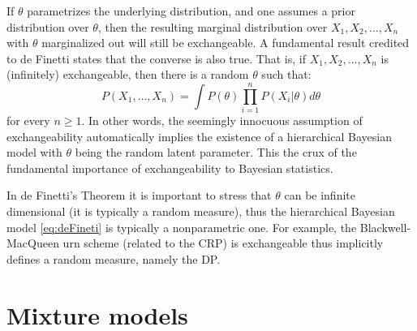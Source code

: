 If $\theta$ parametrizes the underlying distribution, and one assumes a prior distribution over $\theta$, then the resulting marginal distribution over $X_1,X_2,\dots,X_n$ with $\theta$ marginalized out will still be exchangeable. A fundamental result credited to de Finetti \cite{finetti31} states that the converse is also true. That is, if $X_1,X_2,\dots,X_n$ is (infinitely) exchangeable, then there is a random $\theta$ such that:
\begin{equation} \label{eq:deFineti}
P(X_1,\dots,X_n) = \int{P(\theta)\prod_{i=1}^n{P(X_i|\theta) d\theta}}
\end{equation}
for every $n \ge 1$. In other words, the seemingly innocuous assumption of exchangeability automatically implies the existence of a hierarchical Bayesian model with $\theta$ being the random latent parameter. This the crux of the fundamental importance of exchangeability to Bayesian statistics.

In de Finetti’s Theorem it is important to stress that $\theta$ can be infinite dimensional (it is typically a random measure), thus the hierarchical Bayesian model \ref{eq:deFineti} is typically a nonparametric one. For example, the Blackwell-MacQueen urn scheme (related to the \gls{CRP}) is exchangeable thus implicitly defines a random measure, namely the \gls{DP}.


\section{Mixture models}
